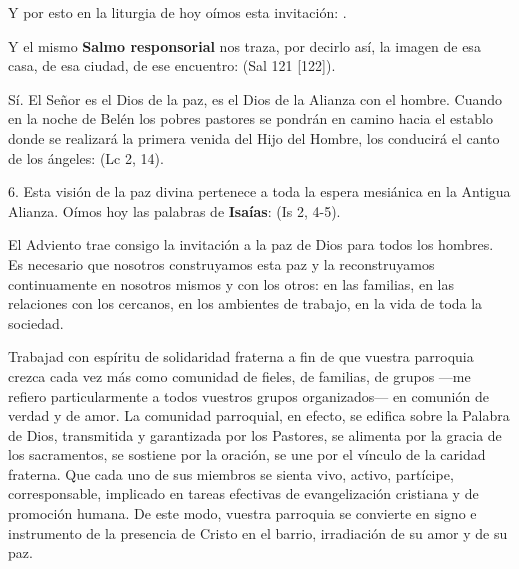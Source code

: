 \begin{body}
	Y por esto en la liturgia de hoy oímos esta invitación: . 
	
	Y el mismo \textbf{Salmo responsorial} nos traza, por decirlo así, la imagen de esa casa, de esa ciudad, de ese encuentro:  (Sal 121 {[}122{]}). 
	
	Sí. El Señor es el Dios de la paz, es el Dios de la Alianza con el hombre. Cuando en la noche de Belén los pobres pastores se pondrán en camino hacia el establo donde se realizará la primera venida del Hijo del Hombre, los conducirá el canto de los ángeles:  (Lc 2, 14). 
	
	6. Esta visión de la paz divina pertenece a toda la espera mesiánica en la Antigua Alianza. Oímos hoy las palabras de \textbf{Isaías}:  (Is 2, 4-5). 
	
	El Adviento trae consigo la invitación a la paz de Dios para todos los hombres. Es necesario que nosotros construyamos esta paz y la reconstruyamos continuamente en nosotros mismos y con los otros: en las familias, en las relaciones con los cercanos, en los ambientes de trabajo, en la vida de toda la sociedad. 
	
	Trabajad con espíritu de solidaridad fraterna a fin de que vuestra parroquia crezca cada vez más como comunidad de fieles, de familias, de grupos ---me refiero particularmente a todos vuestros grupos organizados--- en comunión de verdad y de amor. La comunidad parroquial, en efecto, se edifica sobre la Palabra de Dios, transmitida y garantizada por los Pastores, se alimenta por la gracia de los sacramentos, se sostiene por la oración, se une por el vínculo de la caridad fraterna. Que cada uno de sus miembros se sienta vivo, activo, partícipe, corresponsable, implicado en tareas efectivas de evangelización cristiana y de promoción humana. De este modo, vuestra parroquia se convierte en signo e instrumento de la presencia de Cristo en el barrio, irradiación de su amor y de su paz. 
	

\end{body}
